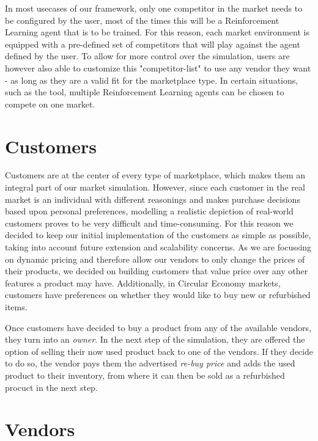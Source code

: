 In most usecases of our framework, only one competitor in the market needs to be configured by the user, most of the times this will be a Reinforcement Learning agent that is to be trained. For this reason, each market environment is equipped with a pre-defined set of competitors that will play against the agent defined by the user. To allow for more control over the simulation, users are however also able to customize this "competitor-list" to use any vendor they want - as long as they are a valid fit for the marketplace type. In certain situations, such as the  tool, multiple Reinforcement Learning agents can be chosen to compete on one market.

\section{Customers} \label{sec:Customers}

Customers are at the center of every type of marketplace, which makes them an integral part of our market simulation. However, since each customer in the real market is an individual with different reasonings and makes purchase decisions based upon personal preferences, modelling a realistic depiction of real-world customers proves to be very difficult and time-consuming. For this reason we decided to keep our initial implementation of the customers as simple as possible, taking into account future extension and scalability concerns. As we are focussing on dynamic pricing and therefore allow our vendors to only change the prices of their products, we decided on building customers that value price over any other features a product may have. Additionally, in Circular Economy markets, customers have preferences on whether they would like to buy new or refurbished items.

Once customers have decided to buy a product from any of the available vendors, they turn into an \emph{owner}. In the next step of the simulation, they are offered the option of selling their now used product back to one of the vendors. If they decide to do so, the vendor pays them the advertised \emph{re-buy price} and adds the used product to their inventory, from where it can then be sold as a refurbished procuct in the next step.

\section{Vendors} \label{sec:ExplainVendors}

